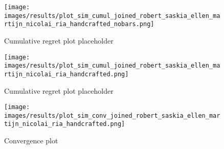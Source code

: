\begin{figure}[ht]
	\centering
	\texttt{[image: images/results/plot\_sim\_cumul\_joined\_robert\_saskia\_ellen\_martijn\_nicolai\_ria\_handcrafted\_nobars.png]}
	\caption{Cumulative regret plot placeholder}
	\label{fig:cumul_nobars_placeholder2}
\end{figure}
\begin{figure}[ht]
	\centering
	\texttt{[image: images/results/plot\_sim\_cumul\_joined\_robert\_saskia\_ellen\_martijn\_nicolai\_ria\_handcrafted.png]}
	\caption{Cumulative regret plot placeholder}
	\label{fig:cumul_placeholder2}
\end{figure}
\begin{figure}[ht]
	\centering
	\texttt{[image: images/results/plot\_sim\_conv\_joined\_robert\_saskia\_ellen\_martijn\_nicolai\_ria\_handcrafted.png]}
	\caption{Convergence plot}
	\label{fig:conv_placeholder2}
\end{figure}

